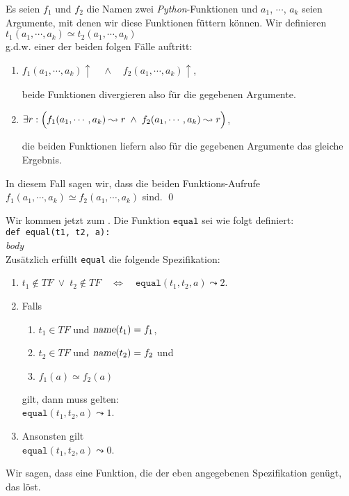 \begin{Definition}[$\simeq$]  
Es seien $f_1$ und $f_2$ die Namen zwei \textsl{Python}-Funktionen und
  $a_1$, $\cdots$, $a_k$ seien Argumente, mit denen wir diese Funktionen füttern können. Wir definieren \\[0.1cm]
\hspace*{1.3cm} $t_1(a_1,\cdots,a_k) \simeq t_2(a_1,\cdots,a_k)$ \\[0.1cm]
g.d.w. einer der beiden folgen Fälle auftritt:
\begin{enumerate}
\item $f_1(a_1,\cdots,a_k)\uparrow \quad\wedge\quad f_2(a_1,\cdots,a_k)\uparrow$,

      beide Funktionen divergieren also für die gegebenen Argumente.
\item $\exists r: \Bigl(f_1(a_1,\cdots,a_k) \leadsto r \;\wedge\; f_2(a_1,\cdots,a_k) \leadsto r\Bigr)$,

      die beiden Funktionen liefern also für die gegebenen Argumente das gleiche Ergebnis.
\end{enumerate}
      In diesem Fall sagen wir, dass die beiden Funktions-Aufrufe 
      $f_1(a_1,\cdots,a_k) \simeq f_2(a_1,\cdots,a_k)$  sind.  
      \qed
\end{Definition}

\noindent
Wir kommen jetzt zum .  Die Funktion $\texttt{equal}$ sei wie folgt definiert:
\\[0.2cm]
\hspace*{1.3cm} \texttt{def equal(t1, t2, a):} \\
\hspace*{2.2cm} \textsl{body}
\\[0.2cm]
Zusätzlich erfüllt \texttt{equal} die folgende Spezifikation:
\begin{enumerate}
\item $t_1 \not\in T\!F \;\vee\; t_2 \not\in T\!F \quad\Leftrightarrow\quad \mathtt{equal}(t_1, t_2, a) \leadsto 2$.
\item Falls 
  \begin{enumerate}
  \item $t_1 \in T\!F$ \quad und \quad $\textsl{name}(t_1) = f_1$,
  \item $t_2 \in T\!F$ \quad und \quad $\textsl{name}(t_2) = f_2$ \quad und
  \item $f_1(a) \simeq f_2(a)$
  \end{enumerate}
    gilt, dann muss gelten: \\[0.1cm]
   \hspace*{1.3cm}  $\mathtt{equal}(t_1, t_2, a) \leadsto 1$.
\item Ansonsten gilt \\[0.1cm]
      \hspace*{1.3cm} $\mathtt{equal}(t_1, t_2, a) \leadsto 0$.
\end{enumerate}
Wir sagen, dass eine Funktion, die der eben angegebenen Spezifikation genügt, das
 löst.

